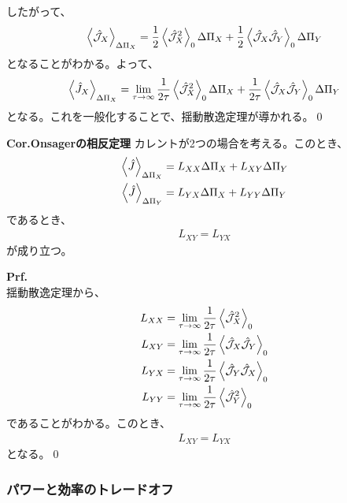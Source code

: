 \documentclass[a4paper,11pt]{jsarticle}
\numberwithin{equation}{section}
\begin{document}
したがって、
\begin{align}
  \ev{\hat{\mathcal{J}}_X }_{\Delta \Pi_X} = \frac{1}{2}\ev{\hat{\mathcal{J}}_X^2}_{0} \Delta \Pi_X + \frac{1}{2}\ev{\hat{\mathcal{J}}_X \hat{\mathcal{J}}_Y}_{0} \Delta \Pi_Y
\end{align}
となることがわかる。よって、
\begin{align}
  \ev{\hat{{J}}_X }_{\Delta \Pi_X} = \lim_{\tau \to \infty}\frac{1}{2\tau}\ev{\hat{\mathcal{J}}_X^2}_{0} \Delta \Pi_X + \frac{1}{2\tau}\ev{\hat{\mathcal{J}}_X \hat{\mathcal{J}}_Y}_{0} \Delta \Pi_Y
\end{align}
となる。これを一般化することで、揺動散逸定理が導かれる。\qed\\

\begin{itembox}[l]{\textbf{Cor.Onsagerの相反定理}}
  カレントが2つの場合を考える。このとき、
  \begin{align}
    \ev{\hat{J}}_{\Delta \Pi_X} &= L_{XX}\Delta \Pi_X + L_{XY}\Delta \Pi_Y\\
    \ev{\hat{J}}_{\Delta \Pi_Y} &= L_{YX}\Delta \Pi_X + L_{YY}\Delta \Pi_Y
  \end{align}
  であるとき、
  \begin{align}
    L_{XY} = L_{YX}
  \end{align}
  が成り立つ。
\end{itembox}
\textbf{Prf.}\\
揺動散逸定理から、
\begin{align}
  L_{XX} &= \lim_{\tau \to \infty}\frac{1}{2\tau}\ev{\hat{\mathcal{J}}_X^2}_{0}\\
  L_{XY} &= \lim_{\tau \to \infty}\frac{1}{2\tau}\ev{\hat{\mathcal{J}}_X \hat{\mathcal{J}}_Y}_{0}\\
  L_{YX} &= \lim_{\tau \to \infty}\frac{1}{2\tau}\ev{\hat{\mathcal{J}}_Y \hat{\mathcal{J}}_X}_{0}\\
  L_{YY} &= \lim_{\tau \to \infty}\frac{1}{2\tau}\ev{\hat{\mathcal{J}}_Y^2}_{0}
\end{align}
であることがわかる。このとき、
\begin{align}
  L_{XY} = L_{YX}
\end{align}
となる。\qed\\

\subsubsection{パワーと効率のトレードオフ}
\end{document}
